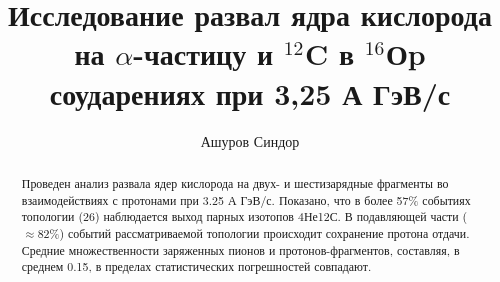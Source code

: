 \documentclass{beamer}
\title{Исследование развал ядра кислорода на $\alpha$-частицу и $^{12}$C в $^{16}$Оp соударениях при 3,25 А ГэВ/с}
\author{Ашуров Синдор}
\date{}
\begin{document}
\frame{\titlepage}

\begin{frame}
\begin{abstract}
   Проведен анализ развала ядер кислорода на двух- и шестизарядные фрагменты во взаимодействиях с протонами при 3.25 А ГэВ/с. Показано, что в более 57\% событиях топологии (26) наблюдается выход парных изотопов 4Не12С. В подавляющей части ($\approx$82\%) событий рассматриваемой топологии происходит сохранение протона отдачи. Средние множественности заряженных пионов и протонов-фрагментов, составляя, в среднем 0.15, в пределах статистических погрешностей совпадают. 
\end{abstract}
   
\end{frame}
\end{document}
